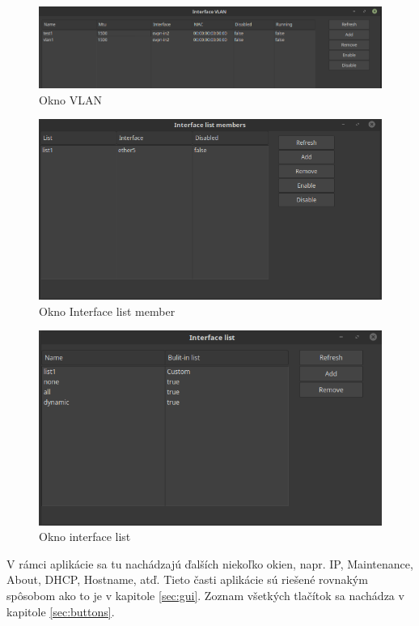 \begin{figure}[H]
\centering
\includegraphics[scale=0.35]{../text/vlangui.png}
\caption{Okno VLAN}
\label{fig:vlangui}
\end{figure}
\begin{figure}[H]
\centering
\includegraphics[scale=0.35]{../text/ifacelistmember.png}
\caption{Okno Interface list member}
\label{fig:interfacelistmembergui}
\end{figure}
\begin{figure}[H]
\centering
\includegraphics[scale=0.45]{../text/ifacelist.png}
\caption{Okno interface list}
\label{fig:interfacelistgui}
\end{figure}
V rámci aplikácie sa tu nachádzajú ďalších niekoľko okien, napr. IP, Maintenance, About, DHCP, Hostname, atď. Tieto časti aplikácie sú riešené rovnakým spôsobom ako to je v kapitole \ref{sec:gui}. Zoznam všetkých tlačítok sa nachádza v kapitole \ref{sec:buttons}.
